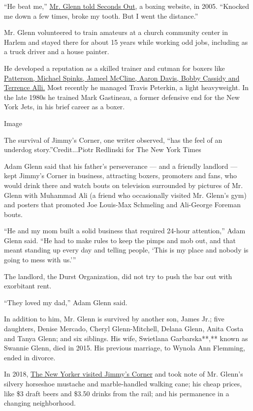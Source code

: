 ``He beat me,''
\href{https://www.secondsout.com/columns/thomas-hauser/happy-birthday-jimmy-glenn}{Mr.
Glenn told Seconds Out}, a boxing website, in 2005. ``Knocked me down a
few times, broke my tooth. But I went the distance.''

Mr. Glenn volunteered to train amateurs at a church community center in
Harlem and stayed there for about 15 years while working odd jobs,
including as a truck driver and a house painter.

He developed a reputation as a skilled trainer and cutman for boxers
like \href{https://boxrec.com/media/index.php/Jimmy_Glenn}{Patterson,
Michael Spinks, Jameel McCline, Aaron Davis, Bobby Cassidy and Terrence
Alli.} Most recently he managed Travis Peterkin, a light heavyweight. In
the late 1980s he trained Mark Gastineau, a former defensive end for the
New York Jets, in his brief career as a boxer.

Image

The survival of Jimmy's Corner, one writer observed, ``has the feel of
an underdog story.''Credit...Piotr Redlinski for The New York Times

Adam Glenn said that his father's perseverance --- and a friendly
landlord --- kept Jimmy's Corner in business, attracting boxers,
promoters and fans, who would drink there and watch bouts on television
surrounded by pictures of Mr. Glenn with Muhammad Ali (a friend who
occasionally visited Mr. Glenn's gym) and posters that promoted Joe
Louis-Max Schmeling and Ali-George Foreman bouts.

``He and my mom built a solid business that required 24-hour
attention,'' Adam Glenn said. ``He had to make rules to keep the pimps
and mob out, and that meant standing up every day and telling people,
`This is my place and nobody is going to mess with us.'''

The landlord, the Durst Organization, did not try to push the bar out
with exorbitant rent.

``They loved my dad,'' Adam Glenn said.

In addition to him, Mr. Glenn is survived by another son, James Jr.;
five daughters, Denise Mercado, Cheryl Glenn-Mitchell, Delana Glenn,
Anita Costa and Tanya Glenn; and six siblings. His wife, Swietlana
Garbarska**,** known as Swannie Glenn, died in 2015. His previous
marriage, to Wynola Ann Flemming, ended in divorce.

In 2018,
\href{https://www.newyorker.com/magazine/2018/05/21/the-underdog-story-of-times-squares-still-gritty-jimmys-corner}{The
New Yorker visited Jimmy's Corner} and took note of Mr. Glenn's silvery
horseshoe mustache and marble-handled walking cane; his cheap prices,
like \$3 draft beers and \$3.50 drinks from the rail; and his permanence
in a changing neighborhood.

